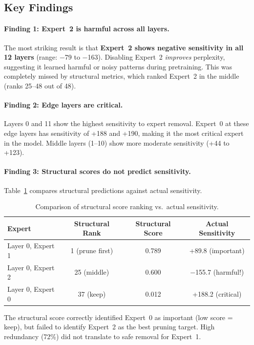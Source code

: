 \documentclass{article}
\begin{document}
\subsection{Key Findings}

\paragraph{Finding 1: Expert~2 is harmful across all layers.}
The most striking result is that \textbf{Expert~2 shows negative sensitivity in
all 12 layers} (range: $-$79 to $-$163).
Disabling Expert~2 \emph{improves} perplexity, suggesting it learned harmful or
noisy patterns during pretraining.
This was completely missed by structural metrics, which ranked Expert~2 in the
middle (ranks 25--48 out of 48).

\paragraph{Finding 2: Edge layers are critical.}
Layers 0 and 11 show the highest sensitivity to expert removal.
Expert~0 at these edge layers has sensitivity of +188 and +190, making it the
most critical expert in the model.
Middle layers (1--10) show more moderate sensitivity (+44 to +123).

\paragraph{Finding 3: Structural scores do not predict sensitivity.}
Table~\ref{tab:comparison} compares structural predictions against actual sensitivity.

\begin{table}[h]
\centering
\caption{Comparison of structural score ranking vs.\ actual sensitivity.}
\label{tab:comparison}
\begin{tabular}{lccc}
\toprule
\textbf{Expert} & \textbf{Structural Rank} & \textbf{Structural Score} & \textbf{Actual Sensitivity} \\
\midrule
Layer 0, Expert 1 & 1 (prune first) & 0.789 & +89.8 (important) \\
Layer 0, Expert 2 & 25 (middle)     & 0.600 & $-$155.7 (harmful!) \\
Layer 0, Expert 0 & 37 (keep)       & 0.012 & +188.2 (critical) \\
\bottomrule
\end{tabular}
\end{table}

The structural score correctly identified Expert~0 as important (low score = keep),
but failed to identify Expert~2 as the best pruning target.
High redundancy (72\%) did not translate to safe removal for Expert~1.
\end{document}
